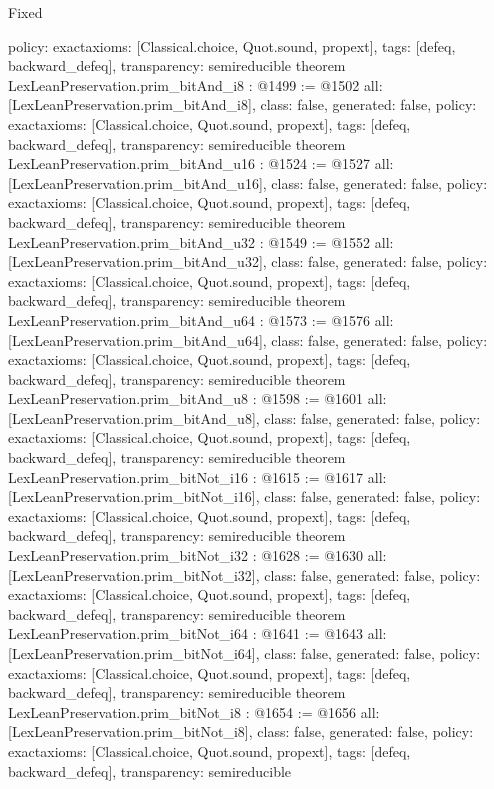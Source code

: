 \begin{lexlean}{Fixed}
\begin{coremodule}
{  policy: exact{axioms: [Classical.choice, Quot.sound, propext]},
  tags: [defeq, backward_defeq],
  transparency: semireducible
}
theorem LexLeanPreservation.prim_bitAnd_i8 : @1499 := @1502 {
  all: [LexLeanPreservation.prim_bitAnd_i8],
  class: false,
  generated: false,
  policy: exact{axioms: [Classical.choice, Quot.sound, propext]},
  tags: [defeq, backward_defeq],
  transparency: semireducible
}
theorem LexLeanPreservation.prim_bitAnd_u16 : @1524 := @1527 {
  all: [LexLeanPreservation.prim_bitAnd_u16],
  class: false,
  generated: false,
  policy: exact{axioms: [Classical.choice, Quot.sound, propext]},
  tags: [defeq, backward_defeq],
  transparency: semireducible
}
theorem LexLeanPreservation.prim_bitAnd_u32 : @1549 := @1552 {
  all: [LexLeanPreservation.prim_bitAnd_u32],
  class: false,
  generated: false,
  policy: exact{axioms: [Classical.choice, Quot.sound, propext]},
  tags: [defeq, backward_defeq],
  transparency: semireducible
}
theorem LexLeanPreservation.prim_bitAnd_u64 : @1573 := @1576 {
  all: [LexLeanPreservation.prim_bitAnd_u64],
  class: false,
  generated: false,
  policy: exact{axioms: [Classical.choice, Quot.sound, propext]},
  tags: [defeq, backward_defeq],
  transparency: semireducible
}
theorem LexLeanPreservation.prim_bitAnd_u8 : @1598 := @1601 {
  all: [LexLeanPreservation.prim_bitAnd_u8],
  class: false,
  generated: false,
  policy: exact{axioms: [Classical.choice, Quot.sound, propext]},
  tags: [defeq, backward_defeq],
  transparency: semireducible
}
theorem LexLeanPreservation.prim_bitNot_i16 : @1615 := @1617 {
  all: [LexLeanPreservation.prim_bitNot_i16],
  class: false,
  generated: false,
  policy: exact{axioms: [Classical.choice, Quot.sound, propext]},
  tags: [defeq, backward_defeq],
  transparency: semireducible
}
theorem LexLeanPreservation.prim_bitNot_i32 : @1628 := @1630 {
  all: [LexLeanPreservation.prim_bitNot_i32],
  class: false,
  generated: false,
  policy: exact{axioms: [Classical.choice, Quot.sound, propext]},
  tags: [defeq, backward_defeq],
  transparency: semireducible
}
theorem LexLeanPreservation.prim_bitNot_i64 : @1641 := @1643 {
  all: [LexLeanPreservation.prim_bitNot_i64],
  class: false,
  generated: false,
  policy: exact{axioms: [Classical.choice, Quot.sound, propext]},
  tags: [defeq, backward_defeq],
  transparency: semireducible
}
theorem LexLeanPreservation.prim_bitNot_i8 : @1654 := @1656 {
  all: [LexLeanPreservation.prim_bitNot_i8],
  class: false,
  generated: false,
  policy: exact{axioms: [Classical.choice, Quot.sound, propext]},
  tags: [defeq, backward_defeq],
  transparency: semireducible
}
\end{coremodule}
\end{lexlean}
